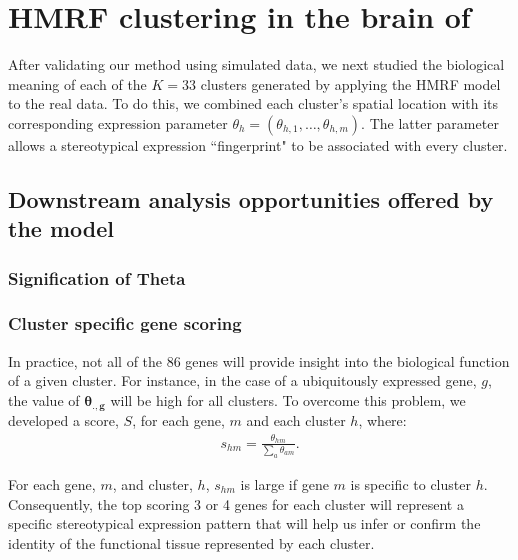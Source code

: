 \chapter{HMRF clustering in the brain of \platyfull{}}\label{ch:biology} 
After validating our method using simulated data, we next studied the biological meaning of each of the $K=33$ clusters generated by applying the HMRF model to the real data. To do this, we combined each cluster's spatial location with its corresponding expression parameter $\theta_{h} = (\theta_{h,1},\dots,\theta_{h,m})$. The latter parameter allows a stereotypical expression ``fingerprint" to be associated with every cluster.\\

	\section{Downstream analysis opportunities offered by the model}
		\subsection{Signification of Theta}
		\subsection{Cluster specific gene scoring}
	In practice, not all of the 86 genes will provide insight into the biological function of a given cluster. For instance, in the case of a ubiquitously expressed gene, $g$, the value of $\mathbf{\theta_{.,g}}$ will be high for all clusters. To overcome this problem, we developed a score, $S$, for each gene, $m$ and each cluster $h$, where:
\begin{align*}
s_{hm} = \frac{\theta_{hm}}{\sum_{a} \theta_{am}}.
\end{align*}

For each gene, $m$, and cluster, $h$, $s_{hm}$ is large if gene $m$ is specific to cluster $h$. Consequently, the top scoring 3 or 4 genes for each cluster will represent a specific stereotypical expression pattern that will help us infer or confirm the identity of the functional tissue represented by each cluster.\\

